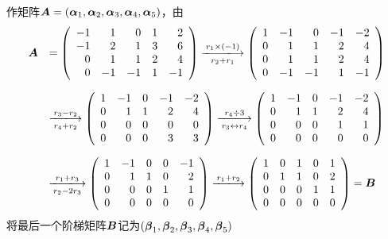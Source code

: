 \begin{frame}[allowframebreaks]
\begin{jie}
作矩阵$\boldsymbol{A}=(\boldsymbol{\alpha}_1,\boldsymbol{\alpha}_2,\boldsymbol{\alpha}_3,\boldsymbol{\alpha}_4,\boldsymbol{\alpha}_5)$，由
$$
\begin{array}{rl}
  \MA &= \left(
       \begin{array}{rrrrr}
         -1&1&0&1&2\\
         -1&2&1&3&6\\
         0&1&1&2&4\\
         0&-1&-1&1&-1
       \end{array}
                    \right) \xlongrightarrow[r_2+r_1]{ r_1\times(-1)}
                    \left(
                    \begin{array}{rrrrr}
                      1&-1&0&-1&-2\\
                      0&1&1&2&4\\
                      0&1&1&2&4\\
                      0&-1&-1&1&-1
                    \end{array}
                                 \right)\\[0.4in]
     &\xlongrightarrow[r_4+r_2]{r_3- r_2}
       \left(
       \begin{array}{rrrrr}
         1&-1&0&-1&-2\\
         0&1&1&2&4\\
         0&0&0&0&0\\
         0&0&0&3&3
       \end{array}
                  \right) \xlongrightarrow[r_3\leftrightarrow r_4]{r_4\div 3}
                  \left(
                  \begin{array}{rrrrr}
                    1&-1&0&-1&-2\\
                    0&1&1&2&4\\
                    0&0&0&1&1\\
                    0&0&0&0&0
                  \end{array}
                             \right)
\end{array}
$$

$$
\begin{array}{rl}
  & \xlongrightarrow[r_2 -2 r_3]{r_1+r_3}
    \left(
    \begin{array}{rrrrr}
      1&-1&0&0&-1\\
      0&1&1&0&2\\
      0&0&0&1&1\\
      0&0&0&0&0
    \end{array}
               \right) \xlongrightarrow[]{r_1+r_2}
               \left(
               \begin{array}{rrrrr}
                 1&0&1&0&1\\
                 0&1&1&0&2\\
                 0&0&0&1&1\\
                 0&0&0&0&0
               \end{array}
                          \right) = \MB
\end{array}
$$
将最后一个阶梯矩阵$\boldsymbol{B}$记为$(\boldsymbol{\beta}_1,\boldsymbol{\beta}_2,\boldsymbol{\beta}_3,\boldsymbol{\beta}_4,\boldsymbol{\beta}_5)$


\end{jie}
\end{frame}
